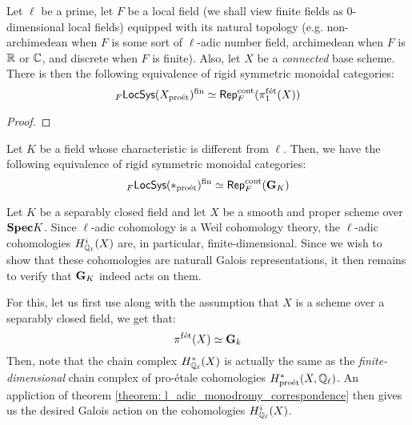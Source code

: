             \begin{theorem} \label{theorem: l_adic_monodromy_correspondence}
                Let $\ell$ be a prime, let $F$ be a local field (we shall view finite fields as $0$-dimensional local fields) equipped with its natural topology (e.g. non-archimedean when $F$ is some sort of $\ell$-adic number field, archimedean when $F$ is $\mathbb{R}$ or $\mathbb{C}$, and discrete when $F$ is finite). Also, let $X$ be a \textit{connected} base scheme. There is then the following equivalence of rigid symmetric monoidal categories:
                    $${}_F\mathsf{LocSys}(X_{\mathrm{pro\acute{e}t}})^{\mathrm{fin}} \simeq \mathsf{Rep}_F^{\mathrm{cont}}(\pi_1^{\mathrm{f\acute{e}t}}(X))$$
            \end{theorem}
                \begin{proof}
                    
                \end{proof}
            \begin{corollary} \label{coro: continuous_galois_representations_as_lisse_sheaves}
                Let $K$ be a field whose characteristic is different from $\ell$. Then, we have the following equivalence of rigid symmetric monoidal categories:
                    $${}_F\mathsf{LocSys}(*_{\mathrm{pro\acute{e}t}})^{\mathrm{fin}} \simeq \mathsf{Rep}_F^{\mathrm{cont}}(\mathbf{G}_K)$$
            \end{corollary}
            \begin{example} \label{example: etale_cohomologies_as_galois_representations}
                Let $K$ be a separably closed field and let $X$ be a smooth and proper scheme over $\mathbf{Spec} K$. Since $\ell$-adic cohomology is a Weil cohomology theory, the $\ell$-adic cohomologies $H^i_{\mathbb{Q}_{\ell}}(X)$ are, in particular, finite-dimensional. Since we wish to show that these cohomologies are naturall Galois representations, it then remains to verify that $\mathbf{G}_K$ indeed acts on them.
                            
                For this, let us first use \cite[\href{https://stacks.math.columbia.edu/tag/0BUM}{Tag 0BUM}]{stacks} along with the assumption that $X$ is a scheme over a separably closed field, we get that:
                    $$\pi^{\mathrm{f\acute{e}t}}(X) \simeq \mathbf{G}_k$$
                Then, note that the chain complex $H^*_{\mathbb{Q}_{\ell}}(X)$ is actually the same as the \textit{finite-dimensional} chain complex of pro-\'etale cohomologies $H^*_{\mathrm{pro\acute{e}t}}(X, \mathbb{Q}_{\ell})$. An appliction of theorem \ref{theorem: l_adic_monodromy_correspondence} then gives us the desired Galois action on the cohomologies $H^i_{\mathbb{Q}_{\ell}}(X)$.
            \end{example}
            
